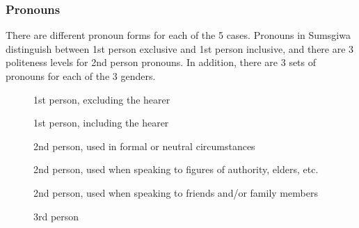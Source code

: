 \subsubsection{Pronouns}
There are different pronoun forms for each of the 5 cases. Pronouns in Sumsgiwa distinguish between 1st person exclusive and 1st person inclusive, and there are 3 politeness levels for 2nd person pronouns. In addition, there are 3 sets of pronouns for each of the 3 genders.
\begin{description}
  \item[] 1st person, excluding the hearer
  \item[] 1st person, including the hearer
  \item[] 2nd person, used in formal or neutral circumstances
  \item[] 2nd person, used when speaking to figures of authority, elders, etc.
  \item[] 2nd person, used when speaking to friends and/or family members
  \item[] 3rd person
\end{description}

